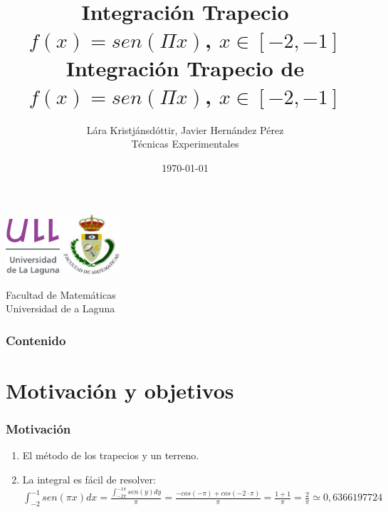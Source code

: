 \documentclass{beamer}
\title{Integración Trapecio \\ $f(x)=sen(\Pi x)$, $x \in [-2,-1]$}
\author{Lára Kristjánsdóttir, Javier Hernández Pérez \\ Técnicas Experimentales}
\date{\today}
\begin{document}
\begin{frame}
  \includegraphics[width=0.15\textwidth]{img/ullesc.eps}
  \hspace*{7.5cm}
  \includegraphics[width=0.16\textwidth]{img/fmatesc.eps}
  \titlepage
  \begin{scriptsize}
    \begin{center}
    \title{Integración Trapecio de $f(x)=sen(\Pi x)$, $x \in [-2,-1]$}
      Facultad de Matemáticas \\Universidad de a Laguna
    \end{center}
  \end{scriptsize}
\end{frame}

\begin{frame}
  \frametitle{Contenido}
  \tableofcontents
\end{frame}

\section{Motivación y objetivos}
\begin{frame}
  \frametitle{Motivación}
  \begin{enumerate}
    \item El método de los trapecios y un terreno.\\
    \pause
    \item La integral es fácil de resolver:\\
    $\int _{-2}^{-1} sen(\pi x) dx=\frac{\int _{-2 \pi}^{-1\pi}sen(y)dy}{\pi}=\frac{-cos(-\pi)+cos(-2 \cdot \pi)}{\pi}=\frac{1+1}{\pi}=\frac{2}{\pi}\simeq 0,6366197724$
  \end{enumerate}
\end{frame}
\end{document}
